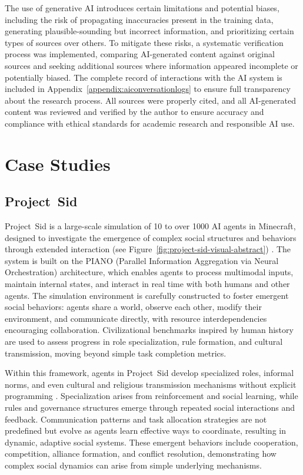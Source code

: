 \documentclass[a4paper, 12pt]{article}
\begin{document}
The use of generative AI introduces certain limitations and potential biases, including the risk of propagating inaccuracies present in the training data, generating plausible-sounding but incorrect information, and prioritizing certain types of sources over others. To mitigate these risks, a systematic verification process was implemented, comparing AI-generated content against original sources and seeking additional sources where information appeared incomplete or potentially biased. The complete record of interactions with the AI system is included in Appendix~\ref{appendix:aiconversationlogs} to ensure full transparency about the research process. All sources were properly cited, and all AI-generated content was reviewed and verified by the author to ensure accuracy and compliance with ethical standards for academic research and responsible AI use.

\section{Case Studies}

\subsection{Project~Sid}

Project~Sid is a large-scale simulation of 10 to over 1000 AI agents in Minecraft, designed to investigate the emergence of complex social structures and behaviors \linebreak through extended interaction (see Figure~\ref{fig:project-sid-visual-abstract}) \autocite{Altera2024}. The system is built on the PIANO (Parallel Information Aggregation via Neural Orchestration) architecture, which enables agents to process multimodal inputs, maintain internal states, and interact in real time with both humans and other agents. The simulation environment is carefully constructed to foster emergent social behaviors: agents share a world, observe each other, modify their environment, and communicate directly, with resource interdependencies encouraging collaboration. Civilizational benchmarks inspired by human history are used to assess progress in role specialization, rule formation, and cultural transmission, moving beyond simple task completion metrics.

Within this framework, agents in Project~Sid develop specialized roles, informal norms, and even cultural and religious transmission mechanisms without explicit programming \autocite{Altera2024}. Specialization arises from reinforcement and social learning, while rules and governance structures emerge through repeated social interactions and feedback. Communication patterns and task allocation strategies are not predefined but evolve as agents learn effective ways to coordinate, resulting in dynamic, adaptive social systems. These emergent behaviors include cooperation, competition, alliance formation, and conflict resolution, demonstrating how complex social dynamics can arise from simple underlying mechanisms.
\end{document}
